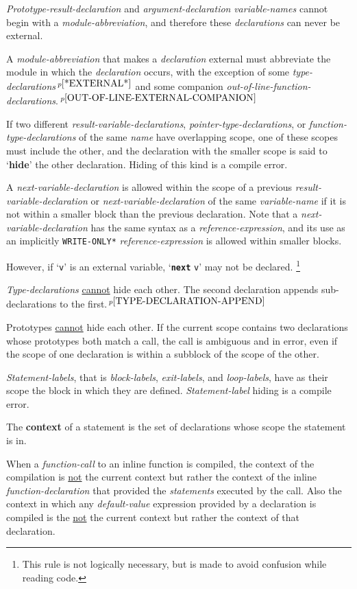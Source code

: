 \documentclass[12pt]{article}
\newcommand{\TT}[1]{{\tt \bfseries #1}}
\newcommand{\key}[1]{{\rm \bfseries #1}}
\newcommand{\pagnote}[1]{$\,^{p\pageref{#1}}$}
\begin{document}
{\em Prototype-result-declaration} and {\em argument-declaration}
{\em variable-names} cannot begin with a {\em module-abbreviation},
and therefore these {\em declarations} can never be external.

A {\em module-abbreviation} that makes a {\em declaration} external
must abbreviate the module in which the {\em declaration} occurs,
with the exception of some {\em type-declarations}\pagnote{*EXTERNAL*}
and some companion
{\em out-of-line-function-declarations}.\pagnote{OUT-OF-LINE-EXTERNAL-COMPANION}

If two different {\em result-variable-declarations},
{\em pointer-type-declarations}, or {\em function-type-de\-clar\-a\-tions}
of the same {\em name} have overlapping
scope, one of these scopes must include the other,
and the declaration with the smaller scope is said to 
`\key{hide}'\label{HIDE} the other declaration.
Hiding of this kind is a compile error.

A {\em next-variable-declaration} is allowed
within the scope of a previous {\em result-variable-de\-clar\-a\-tion}
or {\em next-variable-declaration} of the same {\em variable-name}
if it is not within a smaller block than the previous declaration.
Note that a {\em next-variable-declaration} has
the same syntax as a {\em reference-expression}, and its use
as an implicitly {\tt *WRITE-ONLY*} {\em reference-expression}
is allowed within smaller blocks.

However, if `{\tt v}' is an external variable,
`\TT{next} {\tt v}' may not be declared.%
\footnote{This rule is not logically necessary, but is made to
avoid confusion while reading code.}

{\em Type-declarations} \underline{cannot} hide each other.  The second
declaration appends sub-declarations
to the first.\pagnote{TYPE-DECLARATION-APPEND}

Prototypes \underline{cannot} hide each other.  If the
current scope contains two declarations whose prototypes
both match a call, the call is ambiguous and in error,
even if the scope of one declaration is within
a subblock of the scope of the other.

{\em Statement-labels}, that is {\em block-labels},
{\em exit-labels}, and {\em loop-labels}, have as their scope
the block in which they are defined.  {\em Statement-label}
hiding is a compile error.

The \key{context}\label{CONTEXT} of a statement is the set of declarations
whose scope the statement is in.

When a {\em function-call} to an inline function is compiled,
the context of the compilation is \underline{not} the current context but
rather the context of the inline {\em function-declaration}
that provided the {\em statements} executed by the call.
Also the context in which any {\em default-value} expression
provided by a declaration
is compiled is the \underline{not} the current context but
rather the context of that declaration.
\end{document}
